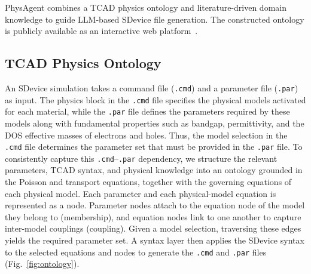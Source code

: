 PhysAgent combines a TCAD physics ontology and literature-driven domain knowledge to guide LLM-based SDevice file generation. The constructed ontology is publicly available as an interactive web platform~\cite{ontology_tcad}.

\subsection{TCAD Physics Ontology}
An SDevice simulation takes a command file (\texttt{.cmd}) and a parameter file (\texttt{.par}) as input. The physics block in the \texttt{.cmd} file specifies the physical models activated for each material, while the \texttt{.par} file defines the parameters required by these models along with fundamental properties such as bandgap, permittivity, and the DOS effective masses of electrons and holes. Thus, the model selection in the \texttt{.cmd} file determines the parameter set that must be provided in the \texttt{.par} file.
To consistently capture this \texttt{.cmd}--\texttt{.par} dependency, we structure the relevant parameters, TCAD syntax, and physical knowledge into an ontology grounded in {\color{red}the Poisson and transport equations, together with the governing equations of each physical model}. {\color{red}Each parameter and each physical-model equation is represented as a node. Parameter nodes attach to the equation node of the model they belong to (membership), and equation nodes link to one another to capture inter-model couplings (coupling). Given a model selection, traversing these edges yields the required parameter set.} A syntax layer then applies the SDevice syntax to the selected equations and nodes to generate the \texttt{.cmd} and \texttt{.par} files (Fig.~\ref{fig:ontology}).

